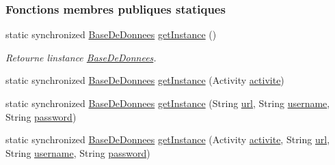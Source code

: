 \subsubsection*{Fonctions membres publiques statiques}
\begin{DoxyCompactItemize}
\item 
static synchronized \hyperlink{classfr_1_1campus_1_1laurainc_1_1honeybee_1_1_base_de_donnees}{Base\+De\+Donnees} \hyperlink{classfr_1_1campus_1_1laurainc_1_1honeybee_1_1_base_de_donnees_a9c2484cfb87f90e46cf878eb7803abb2}{get\+Instance} ()
\begin{DoxyCompactList}\small\item\em Retourne l\textquotesingle{}instance \hyperlink{classfr_1_1campus_1_1laurainc_1_1honeybee_1_1_base_de_donnees}{Base\+De\+Donnees}. \end{DoxyCompactList}\item 
static synchronized \hyperlink{classfr_1_1campus_1_1laurainc_1_1honeybee_1_1_base_de_donnees}{Base\+De\+Donnees} \hyperlink{classfr_1_1campus_1_1laurainc_1_1honeybee_1_1_base_de_donnees_a1946bd458844214e84a5bc1327bbd174}{get\+Instance} (Activity \hyperlink{classfr_1_1campus_1_1laurainc_1_1honeybee_1_1_base_de_donnees_aad4fd29f29916bc4277fa16262d19431}{activite})
\item 
static synchronized \hyperlink{classfr_1_1campus_1_1laurainc_1_1honeybee_1_1_base_de_donnees}{Base\+De\+Donnees} \hyperlink{classfr_1_1campus_1_1laurainc_1_1honeybee_1_1_base_de_donnees_aca2ad0b53f5c21c6a16a7956646c195b}{get\+Instance} (String \hyperlink{classfr_1_1campus_1_1laurainc_1_1honeybee_1_1_base_de_donnees_ad1d04b4da375002e91d8370b9d19918e}{url}, String \hyperlink{classfr_1_1campus_1_1laurainc_1_1honeybee_1_1_base_de_donnees_a7d1662e10f11f740155774b625ed1a87}{username}, String \hyperlink{classfr_1_1campus_1_1laurainc_1_1honeybee_1_1_base_de_donnees_af1bb604a666a7eee9edd93b6cafaf064}{password})
\item 
static synchronized \hyperlink{classfr_1_1campus_1_1laurainc_1_1honeybee_1_1_base_de_donnees}{Base\+De\+Donnees} \hyperlink{classfr_1_1campus_1_1laurainc_1_1honeybee_1_1_base_de_donnees_a8dd37561ed70a74841590d9206248d9b}{get\+Instance} (Activity \hyperlink{classfr_1_1campus_1_1laurainc_1_1honeybee_1_1_base_de_donnees_aad4fd29f29916bc4277fa16262d19431}{activite}, String \hyperlink{classfr_1_1campus_1_1laurainc_1_1honeybee_1_1_base_de_donnees_ad1d04b4da375002e91d8370b9d19918e}{url}, String \hyperlink{classfr_1_1campus_1_1laurainc_1_1honeybee_1_1_base_de_donnees_a7d1662e10f11f740155774b625ed1a87}{username}, String \hyperlink{classfr_1_1campus_1_1laurainc_1_1honeybee_1_1_base_de_donnees_af1bb604a666a7eee9edd93b6cafaf064}{password})
\end{DoxyCompactItemize}
